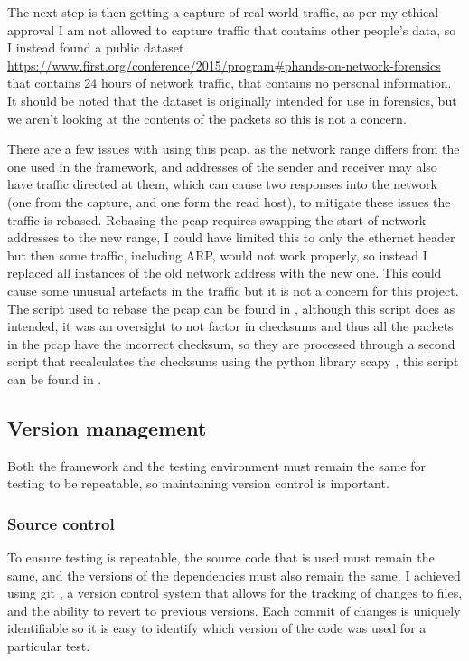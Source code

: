 The next step is then getting a capture of real-world traffic, as per my ethical approval I am not allowed to capture traffic that contains other people's data, so I instead found a public dataset \url{https://www.first.org/conference/2015/program#phands-on-network-forensics} that contains 24 hours of network traffic, that contains no personal information. It should be noted that the dataset is originally intended for use in forensics, but we aren't looking at the contents of the packets so this is not a concern.

There are a few issues with using this pcap, as the network range differs from the one used in the framework, and addresses of the sender and receiver may also have traffic directed at them, which can cause two responses into the network (one from the capture, and one form the read host), to mitigate these issues the traffic is rebased. Rebasing the pcap requires swapping the start of network addresses to the new range, I could have limited this to only the ethernet header but then some traffic, including ARP, would not work properly, so instead I replaced all instances of the old network address with the new one. This could cause some unusual artefacts in the traffic but it is not a concern for this project. The script used to rebase the pcap can be found in , although this script does as intended, it was an oversight to not factor in checksums and thus all the packets in the pcap have the incorrect checksum, so they are processed through a second script that recalculates the checksums using the python library scapy \cite{scapy}, this script can be found in .

\subsection{Version management}

Both the framework and the testing environment must remain the same for testing to be repeatable, so maintaining version control is important.

\subsubsection{Source control}

To ensure testing is repeatable, the source code that is used must remain the same, and the versions of the dependencies must also remain the same. I achieved using git \citep{git}, a version control system that allows for the tracking of changes to files, and the ability to revert to previous versions. Each commit of changes is uniquely identifiable so it is easy to identify which version of the code was used for a particular test.

